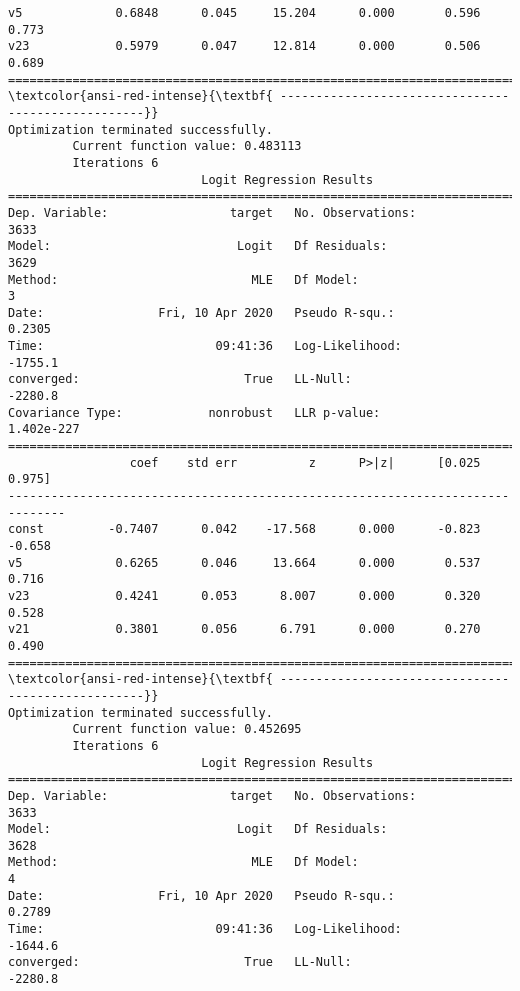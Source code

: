 \documentclass[11pt]{article}
\begin{document}
\begin{Verbatim}[commandchars=\\\{\}]
v5             0.6848      0.045     15.204      0.000       0.596       0.773
v23            0.5979      0.047     12.814      0.000       0.506       0.689
==============================================================================
\textcolor{ansi-red-intense}{\textbf{ ---------------------------------------------------}}
Optimization terminated successfully.
         Current function value: 0.483113
         Iterations 6
                           Logit Regression Results                           
==============================================================================
Dep. Variable:                 target   No. Observations:                 3633
Model:                          Logit   Df Residuals:                     3629
Method:                           MLE   Df Model:                            3
Date:                Fri, 10 Apr 2020   Pseudo R-squ.:                  0.2305
Time:                        09:41:36   Log-Likelihood:                -1755.1
converged:                       True   LL-Null:                       -2280.8
Covariance Type:            nonrobust   LLR p-value:                1.402e-227
==============================================================================
                 coef    std err          z      P>|z|      [0.025      0.975]
------------------------------------------------------------------------------
const         -0.7407      0.042    -17.568      0.000      -0.823      -0.658
v5             0.6265      0.046     13.664      0.000       0.537       0.716
v23            0.4241      0.053      8.007      0.000       0.320       0.528
v21            0.3801      0.056      6.791      0.000       0.270       0.490
==============================================================================
\textcolor{ansi-red-intense}{\textbf{ ---------------------------------------------------}}
Optimization terminated successfully.
         Current function value: 0.452695
         Iterations 6
                           Logit Regression Results                           
==============================================================================
Dep. Variable:                 target   No. Observations:                 3633
Model:                          Logit   Df Residuals:                     3628
Method:                           MLE   Df Model:                            4
Date:                Fri, 10 Apr 2020   Pseudo R-squ.:                  0.2789
Time:                        09:41:36   Log-Likelihood:                -1644.6
converged:                       True   LL-Null:                       -2280.8

\end{Verbatim}
\end{document}
